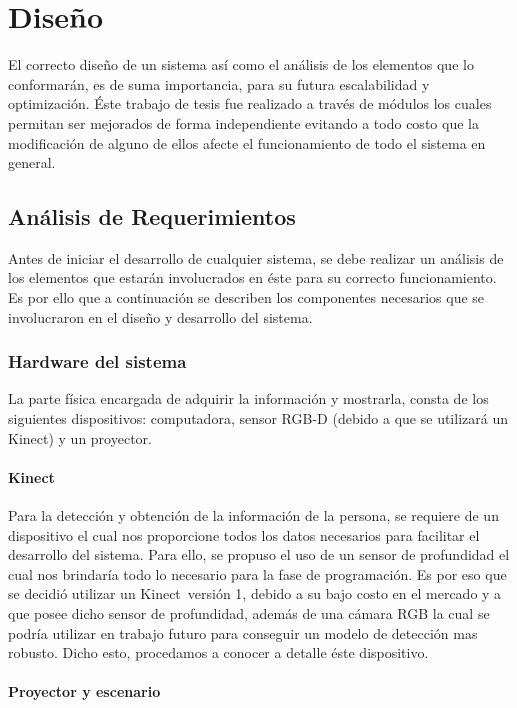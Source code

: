 \documentclass[a4paper,openright,12pt]{report}
\begin{document}

\chapter{Dise\~no}\label{cap.diseno}
El correcto diseño de un sistema así como el análisis de los elementos que lo conformarán, es de suma importancia, para su futura escalabilidad y optimización. Éste trabajo de tesis fue realizado a través de módulos los cuales permitan ser mejorados de forma independiente evitando a todo costo que la modificación de alguno de ellos afecte el funcionamiento de todo el sistema en general.\\
\section{Análisis de Requerimientos}
Antes de iniciar el desarrollo de cualquier sistema, se debe realizar un análisis de los elementos que estarán involucrados en éste para su correcto funcionamiento. Es por ello que a continuación se describen los componentes necesarios que se involucraron en el diseño y desarrollo del sistema.

\subsection{Hardware del sistema}
La parte física encargada de adquirir la información y mostrarla, consta de los siguientes dispositivos: computadora, sensor RGB-D (debido a que se utilizará un Kinect\textregistered) y un proyector.\\
\subsubsection{Kinect}
Para la detección y obtención de la información de la persona, se requiere de un dispositivo el cual nos proporcione todos los datos necesarios para facilitar el desarrollo del sistema. Para ello, se propuso el uso de un sensor de profundidad el cual nos brindaría todo lo necesario para la fase de programación. Es por eso que se decidió utilizar un Kinect\textregistered\ versión 1, debido a su bajo costo en el mercado y a que posee dicho sensor de profundidad, además de una cámara RGB la cual se podría utilizar en trabajo futuro para conseguir un modelo de detección mas robusto. Dicho esto, procedamos a conocer a detalle éste dispositivo.

\subsubsection{Proyector y escenario}
\end{document}
